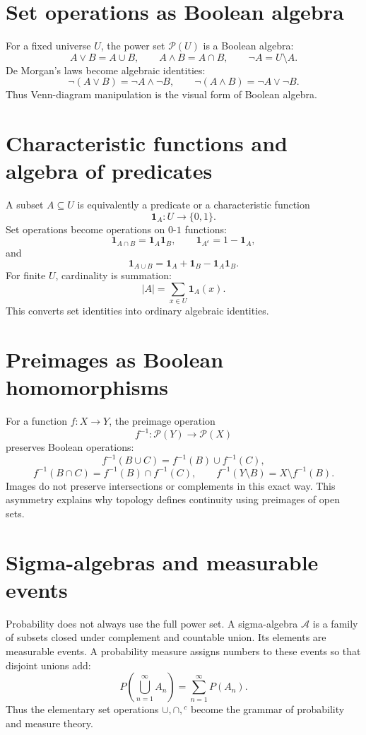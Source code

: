 \section{Set operations as Boolean algebra}

For a fixed universe \(U\), the power set \(\mathcal P(U)\) is a Boolean algebra:
\[
  A\vee B=A\cup B,\qquad
  A\wedge B=A\cap B,\qquad
  \neg A=U\setminus A.
\]
De Morgan's laws become algebraic identities:
\[
  \neg(A\vee B)=\neg A\wedge\neg B,\qquad
  \neg(A\wedge B)=\neg A\vee\neg B.
\]
Thus Venn-diagram manipulation is the visual form of Boolean algebra.

\section{Characteristic functions and algebra of predicates}

A subset \(A\subseteq U\) is equivalently a predicate or a characteristic function
\[
  \mathbf 1_A:U\to\{0,1\}.
\]
Set operations become operations on \(0\)-\(1\) functions:
\[
  \mathbf 1_{A\cap B}=\mathbf 1_A\mathbf 1_B,\qquad
  \mathbf 1_{A^c}=1-\mathbf 1_A,
\]
and
\[
  \mathbf 1_{A\cup B}=\mathbf 1_A+\mathbf 1_B-\mathbf 1_A\mathbf 1_B.
\]
For finite \(U\), cardinality is summation:
\[
  |A|=\sum_{x\in U}\mathbf 1_A(x).
\]
This converts set identities into ordinary algebraic identities.

\section{Preimages as Boolean homomorphisms}

For a function \(f:X\to Y\), the preimage operation
\[
  f^{-1}:\mathcal P(Y)\to\mathcal P(X)
\]
preserves Boolean operations:
\[
  f^{-1}(B\cup C)=f^{-1}(B)\cup f^{-1}(C),
\]
\[
  f^{-1}(B\cap C)=f^{-1}(B)\cap f^{-1}(C),\qquad
  f^{-1}(Y\setminus B)=X\setminus f^{-1}(B).
\]
Images do not preserve intersections or complements in this exact way.  This asymmetry explains why topology defines continuity using preimages of open sets.

\section{Sigma-algebras and measurable events}

Probability does not always use the full power set.  A sigma-algebra \(\mathcal A\) is a family of subsets closed under complement and countable union.  Its elements are measurable events.  A probability measure assigns numbers to these events so that disjoint unions add:
\[
  P\left(\bigcup_{n=1}^{\infty}A_n\right)=\sum_{n=1}^{\infty}P(A_n).
\]
Thus the elementary set operations \(\cup,\cap,{}^c\) become the grammar of probability and measure theory.

